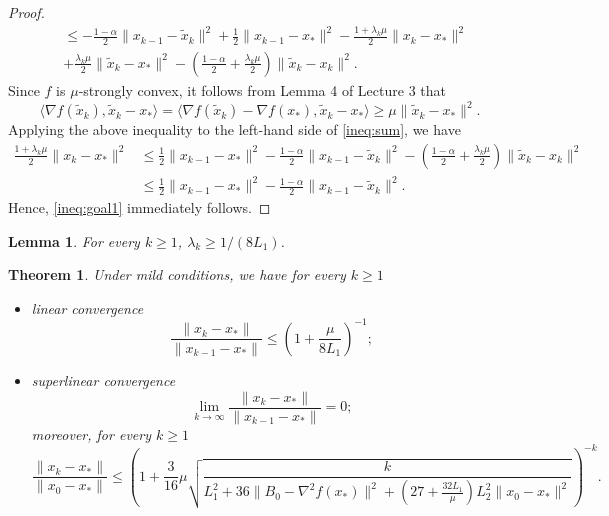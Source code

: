 \documentclass[11pt]{article}
\newtheorem{theorem}{Theorem}
\newtheorem{lemma}{Lemma}
\newcommand{\inner}[2]{\langle #1,#2\rangle}
\newcommand{\tx}{\tilde x}
\begin{document}
\begin{proof}
\begin{align}
		&\le - \frac{1-\alpha}2 \|x_{k-1} - \tx_k\|^2 +  \frac12\|x_{k-1} - x_*\|^2 - \frac{1+\lambda_k \mu}{2} \|x_k - x_*\|^2 \nonumber \\
		&  + \frac{\lambda_k \mu}{2} \|\tx_k - x_*\|^2 - \left(\frac{1-\alpha}2 + \frac{\lambda_k \mu}{2}\right) \|\tx_k - x_k\|^2. \label{ineq:sum}
	\end{align}
	Since $f$ is $\mu$-strongly convex, it follows from Lemma 4 of Lecture 3 that
	\[
	\inner{\nabla f(\tx_k)}{\tx_k - x_*} = \inner{\nabla f(\tx_k) - \nabla f(x_*)}{\tx_k - x_*} \ge \mu \|\tx_k -x_*\|^2.
	\]
	Applying the above inequality to the left-hand side of \eqref{ineq:sum}, we have
	\begin{align*}
		\frac{1+\lambda_k \mu}{2} \|x_k - x_*\|^2 & \le \frac12\|x_{k-1} - x_*\|^2 - \frac{1-\alpha}2 \|x_{k-1} - \tx_k\|^2 - \left(\frac{1-\alpha}2 + \frac{\lambda_k \mu}{2}\right) \|\tx_k - x_k\|^2 \\
		& \le \frac12\|x_{k-1} - x_*\|^2 - \frac{1-\alpha}2 \|x_{k-1} - \tx_k\|^2.
	\end{align*}
	Hence, \eqref{ineq:goal1} immediately follows.
\end{proof}

\begin{lemma}\label{lem:lam}
	For every $k \ge 1$, $\lambda_k \ge 1/(8 L_1)$.
\end{lemma}

\begin{theorem}
	Under mild conditions, we have for every $k\ge 1$
	\begin{itemize}
		\item[(a)] linear convergence
		\[
		\frac{\|x_k-x_*\|}{\|x_{k-1} - x_*\|} \le \left(1+\frac{\mu}{8L_1}\right)^{-1};
		\]
		\item[(b)] superlinear convergence
		\[
		\lim_{k\to \infty}\frac{\|x_k-x_*\|}{\|x_{k-1} - x_*\|} =0;
		\]
		moreover, for every $k\ge 1$
		\[
		\frac{\|x_k-x_*\|}{\|x_0 - x_*\|} \le\left(1+ \frac{3}{16}\mu \sqrt{\frac{k}{L_1^2 + 36 \|B_0-\nabla^2 f(x_*)\|^2 + \left(27+ \frac{32L_1}{\mu}\right) L_2^2\|x_0-x_*\|^2}} \right)^{-k}.
		\]
	\end{itemize}
\end{theorem}
\end{document}
